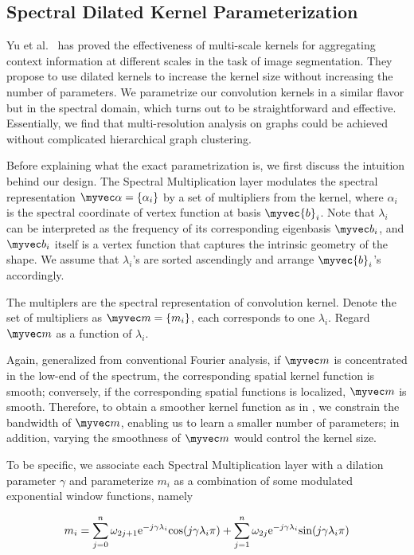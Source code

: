 \subsection{Spectral Dilated Kernel Parameterization}
\label{sdkp}
Yu et al.~\cite{yu2015multi} has proved the effectiveness of multi-scale kernels for aggregating context information at different scales in the task of image segmentation. They propose to use dilated kernels to increase the kernel size without increasing the number of parameters. We parametrize our convolution kernels in a similar flavor but in the spectral domain, which turns out to be straightforward and effective. Essentially, we find that multi-resolution analysis on graphs could be achieved without complicated hierarchical graph clustering.

Before explaining what the exact parametrization is, we first discuss the intuition behind our design. The Spectral Multiplication layer modulates the spectral representation $\myvec \alpha=\{\alpha_i\}$ by a set of multipliers from the kernel, where $\alpha_i$ is the spectral coordinate of vertex function at basis $\myvec{b}_i$. Note that $\lambda_i$ can be interpreted as the frequency of its corresponding eigenbasis $\myvec b_i$, and $\myvec b_i$ itself is a vertex function that captures the intrinsic geometry of the shape. We assume that $\lambda_i$'s are sorted ascendingly and arrange $\myvec{b}_i$'s accordingly.

The multiplers are the spectral representation of convolution kernel. Denote the set of multipliers as $\myvec m=\{m_i\}$, each corresponds to one $\lambda_i$. Regard $\myvec m$ as a function of $\lambda_i$. 

Again, generalized from conventional Fourier analysis, if $\myvec m$ is concentrated in the low-end of the spectrum, the corresponding spatial kernel function is smooth; conversely, if the corresponding spatial functions is localized, $\myvec m$ is smooth. Therefore, to obtain a smoother kernel function as in \cite{yu2015multi}, we constrain the bandwidth of $\myvec m$, enabling us to learn a smaller number of parameters; in addition, varying the smoothness of $\myvec m$ would control the kernel size. 

To be specific, we associate each Spectral Multiplication layer with a dilation parameter $\gamma$ and parameterize $m_i$ as a combination of some modulated exponential window functions, namely

\vspace{-0.25cm}
\begin{align*}
    m_i = \sum_{j=0}^n\omega_{2j+1}\text{e}^{-j\gamma \lambda_i}\text{cos}(j\gamma \lambda_i \pi)
    +\sum_{j=1}^n\omega_{2j}\text{e}^{-j\gamma \lambda_i}\text{sin}(j\gamma \lambda_i \pi)
    \vspace{-0.25cm}
\end{align*}

